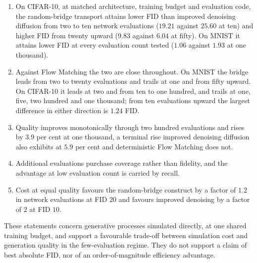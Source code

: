 \begin{enumerate}
\item On CIFAR-10, at matched architecture, training budget and evaluation code,
the random-bridge transport attains lower FID than improved denoising diffusion
from two to ten network evaluations ($19.21$ against $25.60$ at ten) and higher
FID from twenty upward ($9.83$ against $6.04$ at fifty). On MNIST it attains lower FID
at every evaluation count tested ($1.06$ against $1.93$ at one thousand).
\item Against Flow Matching the two are close throughout. On MNIST the bridge
leads from two to twenty evaluations and trails at one and from fifty upward. On CIFAR-10
it leads at two and from ten to one hundred, and trails at one, five, two
hundred and one thousand; from ten evaluations upward the largest difference in
either direction is $1.24$ FID.
\item Quality improves monotonically through two hundred evaluations and rises
by $3.9$ per cent at one thousand, a terminal rise improved denoising diffusion
also exhibits at $5.9$ per cent and deterministic Flow Matching does not.
\item Additional evaluations purchase coverage rather than fidelity, and the
advantage at low evaluation count is carried by recall.
\item Cost at equal quality favours the random-bridge construct by a factor of
$1.2$ in network evaluations at FID $20$ and favours improved denoising by a
factor of $2$ at FID $10$.
\end{enumerate}

These statements concern generative processes simulated directly, at one shared
training budget, and support a favourable trade-off between simulation cost and
generation quality in the few-evaluation regime. They do not support a claim of
best absolute FID, nor of an order-of-magnitude efficiency advantage.

